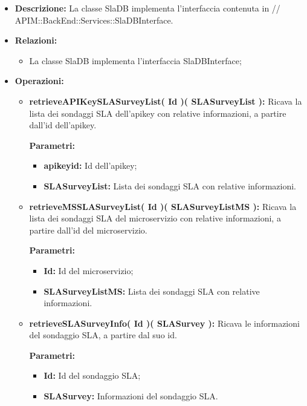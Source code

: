 \begin{itemize}
	\item \textbf{Descrizione:} La classe SlaDB implementa l'interfaccia contenuta in // APIM::BackEnd::Services::SlaDBInterface.
	\item \textbf{Relazioni:}
		\begin{itemize}
			\item La classe SlaDB implementa l'interfaccia SlaDBInterface;
		\end{itemize}
	\item \textbf{Operazioni:}
		\begin{itemize}
		
			\item \textbf{retrieveAPIKeySLASurveyList( Id )( SLASurveyList ):} Ricava la lista dei sondaggi SLA dell'apikey con relative informazioni, a partire dall'id dell'apikey.
				\begin{description}
    				\item[\textbf{Parametri:}]
				\end{description}
				\begin{itemize}
					\item \textbf{apikeyid:} Id dell'apikey;
					\item \textbf{SLASurveyList:} Lista dei sondaggi SLA con relative informazioni.
				\end{itemize}
				
			\item \textbf{retrieveMSSLASurveyList( Id )( SLASurveyListMS ):} Ricava la lista dei sondaggi SLA del microservizio con relative informazioni, a partire dall'id del microservizio.
				\begin{description}
    				\item[\textbf{Parametri:}]
				\end{description}
				\begin{itemize}
					\item \textbf{Id:} Id del microservizio;
					\item \textbf{SLASurveyListMS:} Lista dei sondaggi SLA con relative informazioni.
				\end{itemize}
				
			\item \textbf{retrieveSLASurveyInfo( Id )( SLASurvey ):} Ricava le informazioni del sondaggio SLA, a partire dal suo id.
				\begin{description}
    				\item[\textbf{Parametri:}]
				\end{description}
				\begin{itemize}
					\item \textbf{Id:} Id del sondaggio SLA;
					\item \textbf{SLASurvey:} Informazioni del sondaggio SLA.
				\end{itemize}
				

\end{itemize}
\end{itemize}
